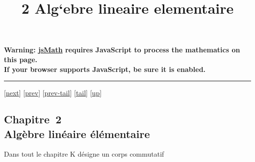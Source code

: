 \documentclass[]{article}
\title{2 Alg`ebre lineaire elementaire}
\author{}
\date{}
\begin{document}
\maketitle

\textbf{Warning: \href{http://www.math.union.edu/locate/jsMath}{jsMath}
requires JavaScript to process the mathematics on this page.\\ If your
browser supports JavaScript, be sure it is enabled.}

\begin{center}\rule{3in}{0.4pt}\end{center}

{[}\href{coursch4.html}{next}{]} {[}\href{coursch2.html}{prev}{]}
{[}\href{coursch2.html\#tailcoursch2.html}{prev-tail}{]}
{[}\hyperref[tailcoursch3.html]{tail}{]}
{[}\href{cours.html\#coursch3.html}{up}{]}

\subsection{Chapitre~2\\Algèbre linéaire élémentaire}

Dans tout le chapitre K désigne un corps commutatif
\end{document}
